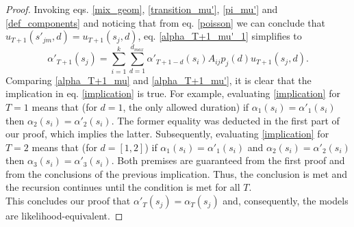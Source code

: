 \documentclass[extendedabs]{recpad2k}
\begin{document}
\begin{proof}
Invoking eqs. \eqref{mix_geom}, \eqref{transition_mu'}, \eqref{pi_mu'} and \eqref{def_components} and noticing that from eq.  \eqref{poisson} we can conclude that $u_{T+1}(s'_{jm},d)=u_{T+1}(s_j,d)$, eq. \eqref{alpha_T+1_mu'_1} simplifies to
\begin{equation}
 \alpha'_{T+1}(s_j) = \sum_{i=1}^k \sum_{d=1}^{d_{max}} \alpha'_{T+1-d}(s_i)A_{ij}p_j(d)u_{T+1}(s_j,d).
  \label{alpha_T+1_mu'}
\end{equation}
Comparing \eqref{alpha_T+1_mu} and  \eqref{alpha_T+1_mu'}, it is clear that the implication in eq. \eqref{implication} is true. For example, evaluating \eqref{implication} for $T=1$ means that (for $d=1$, the only allowed duration) if $\alpha_{1}(s_i)=\alpha'_{1}(s_i)$ then $\alpha_{2}(s_i)=\alpha'_{2}(s_i)$. The former equality was deducted in the first part of our proof, which implies the latter. Subsequently, evaluating \eqref{implication} for $T=2$ means that (for $d=[1,2]$) if $\alpha_{1}(s_i)=\alpha'_{1}(s_i)$ and $\alpha_{2}(s_i)=\alpha'_{2}(s_i)$ then $\alpha_{3}(s_i)=\alpha'_{3}(s_i)$. Both premises are guaranteed from the first proof and from the conclusions of the previous implication. Thus, the conclusion is met and the recursion continues until the condition is met for all $T$. \\ \noindent
This concludes our proof that $\alpha'_T(s_j)=\alpha_T(s_j)$ and, consequently, the models are likelihood-equivalent.
\end{proof}
\fi
\end{document}
